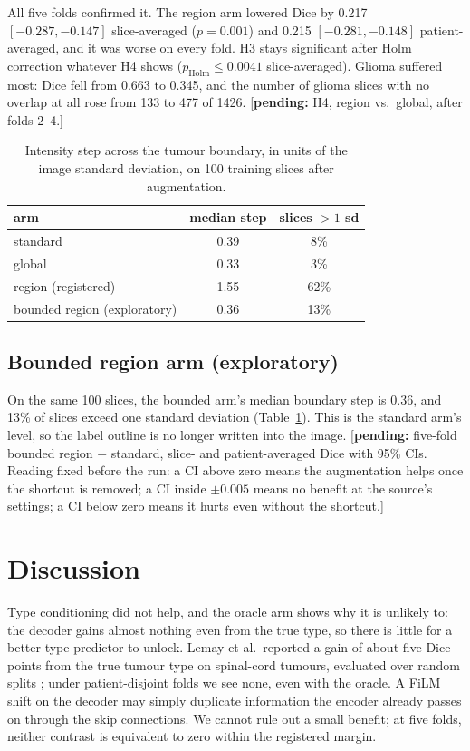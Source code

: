 \documentclass[11pt,a4paper]{article}
\newcommand{\pending}[1]{\textcolor{red!70!black}{[\textbf{pending:} #1]}}
\begin{document}
All five folds confirmed it. The region arm lowered Dice by 0.217
$[-0.287,-0.147]$ slice-averaged ($p=0.001$) and 0.215 $[-0.281,-0.148]$
patient-averaged, and it was worse on every fold. H3 stays significant after Holm
correction whatever H4 shows ($p_{\mathrm{Holm}}\le0.0041$ slice-averaged). Glioma
suffered most: Dice fell from 0.663 to 0.345, and the number of glioma slices
with no overlap at all rose from 133 to 477 of 1426. \pending{H4, region vs.\
global, after folds 2--4.}

\begin{table}[H]
\centering\small
\begin{tabular}{@{}lcc@{}}
\toprule
arm & median step & slices $>1$ sd\\
\midrule
standard & 0.39 & 8\%\\
global & 0.33 & 3\%\\
region (registered) & 1.55 & 62\%\\
bounded region (exploratory) & 0.36 & 13\%\\
\bottomrule
\end{tabular}
\caption{Intensity step across the tumour boundary, in units of the image
standard deviation, on 100 training slices after augmentation.}
\label{tab:step}
\end{table}

\subsection{Bounded region arm (exploratory)}
On the same 100 slices, the bounded arm's median boundary step is 0.36, and 13\%
of slices exceed one standard deviation (Table~\ref{tab:step}). This is the
standard arm's level, so the label outline is no longer written into the image.
\pending{five-fold bounded region $-$ standard, slice- and patient-averaged Dice
with 95\% CIs. Reading fixed before the run: a CI above zero means the
augmentation helps once the shortcut is removed; a CI inside $\pm0.005$ means no
benefit at the source's settings; a CI below zero means it hurts even without the
shortcut.}

\section{Discussion}
Type conditioning did not help, and the oracle arm shows why it is unlikely
to: the decoder gains almost nothing even from the true type, so there is little
for a better type predictor to unlock. Lemay et al.\ reported a gain of about five Dice points from the true tumour type on spinal-cord tumours, evaluated over random splits \citep{lemay2021}; under patient-disjoint folds we see none, even with the oracle. A FiLM shift on the decoder may simply
duplicate information the encoder already passes on through the skip
connections. We cannot rule out a small benefit; at five folds, neither
contrast is equivalent to zero within the registered margin.
\end{document}
